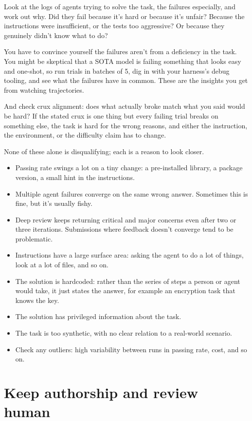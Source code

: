 \documentclass[11pt]{article}
\begin{document}
Look at the logs of agents trying to solve the task, the failures especially, and work out why. Did they fail because it's hard or because it's unfair? Because the instructions were insufficient, or the tests too aggressive? Or because they genuinely didn't know what to do?

You have to convince yourself the failures aren't from a deficiency in the task. You might be skeptical that a SOTA model is failing something that looks easy and one-shot, so run trials in batches of 5, dig in with your harness's debug tooling, and see what the failures have in common. These are the insights you get from watching trajectories.

And check crux alignment: does what actually broke match what you said would be hard? If the stated crux is one thing but every failing trial breaks on something else, the task is hard for the wrong reasons, and either the instruction, the environment, or the difficulty claim has to change.

None of these alone is disqualifying; each is a reason to look closer.

\begin{itemize}
    \item Passing rate swings a lot on a tiny change: a pre-installed library, a package version, a small hint in the instructions.
    \item Multiple agent failures converge on the same wrong answer. Sometimes this is fine, but it's usually fishy.
    \item Deep review keeps returning critical and major concerns even after two or three iterations. Submissions where feedback doesn't converge tend to be problematic.
    \item Instructions have a large surface area: asking the agent to do a lot of things, look at a lot of files, and so on.
    \item The solution is hardcoded: rather than the series of steps a person or agent would take, it just states the answer, for example an encryption task that knows the key.
    \item The solution has privileged information about the task.
    \item The task is too synthetic, with no clear relation to a real-world scenario.
    \item Check any outliers: high variability between runs in passing rate, cost, and so on.
\end{itemize}

\section{Keep authorship and review human}
\end{document}
